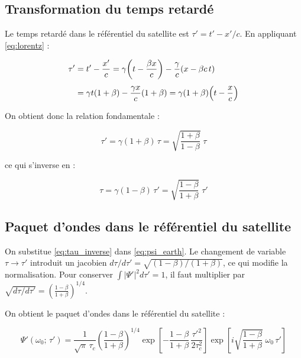 \documentclass[12pt,a4paper]{article}
\begin{document}
\subsection*{Transformation du temps retardé}

Le temps retardé dans le référentiel du satellite est $\tau' = t' - x'/c$. En appliquant
\eqref{eq:lorentz} :

\begin{align}
    \tau' &= t' - \frac{x'}{c}
           = \gamma\!\left(t - \frac{\beta x}{c}\right)
             - \frac{\gamma}{c}\!\left(x - \beta c\, t\right) \notag \\[4pt]
          &= \gamma t(1 + \beta) - \frac{\gamma x}{c}(1 + \beta)
           = \gamma(1+\beta)\!\left(t - \frac{x}{c}\right)
\end{align}

On obtient donc la relation fondamentale :

\begin{equation}
    \boxed{
        \tau' = \gamma(1+\beta)\,\tau
              = \sqrt{\frac{1+\beta}{1-\beta}}\;\tau
    }
    \label{eq:tau_boost}
\end{equation}

ce qui s'inverse en :

\begin{equation}
    \tau = \gamma(1-\beta)\,\tau'
         = \sqrt{\frac{1-\beta}{1+\beta}}\;\tau'
    \label{eq:tau_inverse}
\end{equation}

\subsection*{Paquet d'ondes dans le référentiel du satellite}

On substitue \eqref{eq:tau_inverse} dans \eqref{eq:psi_earth}. Le changement de variable
$\tau \to \tau'$ introduit un jacobien $d\tau/d\tau' = \sqrt{(1-\beta)/(1+\beta)}$, ce qui
modifie la normalisation. Pour conserver $\int|\Psi'|^2 d\tau' = 1$, il faut multiplier par
$\sqrt{d\tau/d\tau'} = \left(\frac{1-\beta}{1+\beta}\right)^{1/4}$.

On obtient le paquet d'ondes dans le référentiel du satellite :

\begin{equation}
    \boxed{
    \Psi'(\omega_0;\, \tau')
    = \frac{1}{\sqrt{\pi}\,\tau_c}
      \left(\frac{1-\beta}{1+\beta}\right)^{\!1/4}
      \exp\!\left[-\frac{1-\beta}{1+\beta}\,\frac{\tau'^2}{2\tau_c^2}\right]
      \exp\!\left[i\sqrt{\frac{1-\beta}{1+\beta}}\;\omega_0\,\tau'\right]
    }
    \label{eq:psi_sat}
\end{equation}
\end{document}

